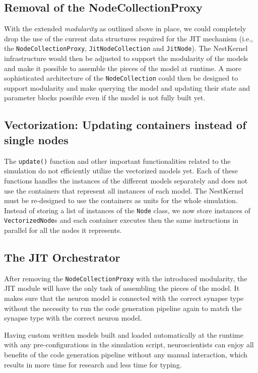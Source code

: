 \subsection*{Removal of the NodeCollectionProxy}

With the extended \emph{modularity} as outlined above in place, we could completely drop the use of the current data structures required for the JIT mechanism (i.e., the \texttt{NodeCollectionProxy}, \texttt{JitNodeCollection} and \texttt{JitNode}). The NestKernel infrastructure would then be adjusted to support the modularity of the models and make it possible to assemble the pieces of the model at runtime. A more sophisticated architecture of the \texttt{NodeCollection} could then be designed to support modularity and make querying the model and updating their state and parameter blocks possible even if the model is not fully built yet.

\subsection*{Vectorization: Updating containers instead of single nodes}

The \texttt{update()} function and other important functionalities related to the simulation do not efficiently utilize the vectorized models yet. Each of these functions handles the instances of the different models separately and does not use the containers that represent all instances of each model. The NestKernel must be re-designed to use the containers as units for the whole simulation. Instead of storing a list of instances of the \texttt{Node} class, we now store instances of \texttt{VectorizedNode}s and each container executes then the same instructions in parallel for all the nodes it represents.

\subsection*{The JIT Orchestrator}

After removing the \texttt{NodeCollectionProxy} with the introduced modularity, the JIT module will have the only task of assembling the pieces of the model. It makes sure that the neuron model is connected with the correct synapse type without the necessity to run the code generation pipeline again to match the synapse type with the correct neuron model.


Having custom written models built and loaded automatically at the runtime with any pre-configurations in the simulation script,  neuroscientists can enjoy all benefits of the code generation pipeline without any manual interaction, which results in more time for research and less time for typing.

\cleardoublepage
